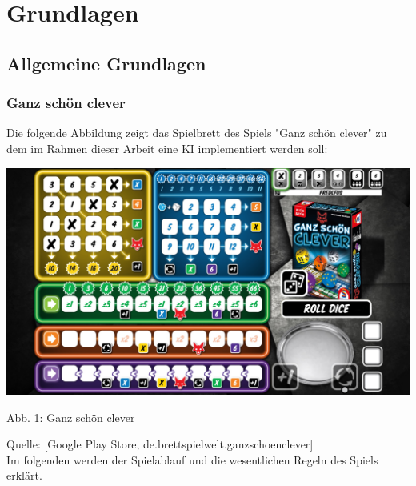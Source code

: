 \section{Grundlagen}
\subsection{Allgemeine Grundlagen}
\subsubsection{Ganz schön clever}
Die folgende Abbildung zeigt das Spielbrett des Spiels "Ganz schön clever" zu dem im Rahmen dieser Arbeit eine KI implementiert werden soll:

\vspace{0.5cm}
\includegraphics[width=1\textwidth]{Bilder/gsc} 

Abb. 1: Ganz schön clever 

Quelle: [Google Play Store, de.brettspielwelt.ganzschoenclever]\\


Im folgenden werden der Spielablauf und die wesentlichen Regeln des Spiels erklärt.


